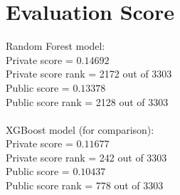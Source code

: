 \section{Evaluation Score}
Random Forest model:\\
Private score = $0.14692$\\
Private score rank = 2172 out of 3303\\
Public score = $0.13378$\\
Public score rank = 2128 out of 3303\\ \\
XGBoost model (for comparison):\\
Private score = $0.11677$\\
Private score rank = 242 out of 3303\\
Public score = $0.10437$\\
Public score rank = 778 out of 3303\\
